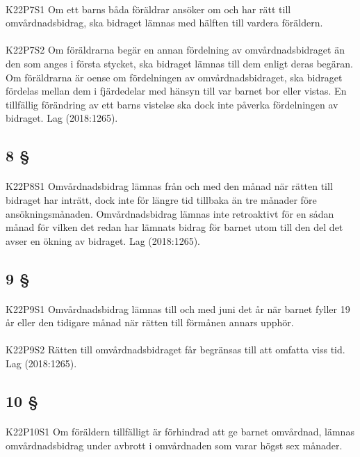 \documentclass[a4paper,notitlepage,openany,10pt]{book}
\begin{document}
\paragraph*{}
{\tiny K22P7S1}
Om ett barns båda föräldrar ansöker om och har rätt till omvårdnadsbidrag, ska bidraget lämnas med hälften till vardera föräldern.
\paragraph*{}
{\tiny K22P7S2}
Om föräldrarna begär en annan fördelning av omvårdnadsbidraget än den som anges i första stycket, ska bidraget lämnas till dem enligt deras begäran. Om föräldrarna är oense om fördelningen av omvårdnadsbidraget, ska bidraget fördelas mellan dem i fjärdedelar med hänsyn till var barnet bor eller vistas. En tillfällig förändring av ett barns vistelse ska dock inte påverka fördelningen av bidraget.
Lag (2018:1265).
\subsection*{8 §}
\paragraph*{}
{\tiny K22P8S1}
Omvårdnadsbidrag lämnas från och med den månad när rätten till bidraget har inträtt, dock inte för längre tid tillbaka än tre månader före ansökningsmånaden. Omvårdnadsbidrag lämnas inte retroaktivt för en sådan månad för vilken det redan har lämnats bidrag för barnet utom till den del det avser en ökning av bidraget.
Lag (2018:1265).
\subsection*{9 §}
\paragraph*{}
{\tiny K22P9S1}
Omvårdnadsbidrag lämnas till och med juni det år när barnet fyller 19 år eller den tidigare månad när rätten till förmånen annars upphör.
\paragraph*{}
{\tiny K22P9S2}
Rätten till omvårdnadsbidraget får begränsas till att omfatta viss tid.
Lag (2018:1265).
\subsection*{10 §}
\paragraph*{}
{\tiny K22P10S1}
Om föräldern tillfälligt är förhindrad att ge barnet omvårdnad, lämnas omvårdnadsbidrag under avbrott i omvårdnaden som varar högst sex månader.
\end{document}
